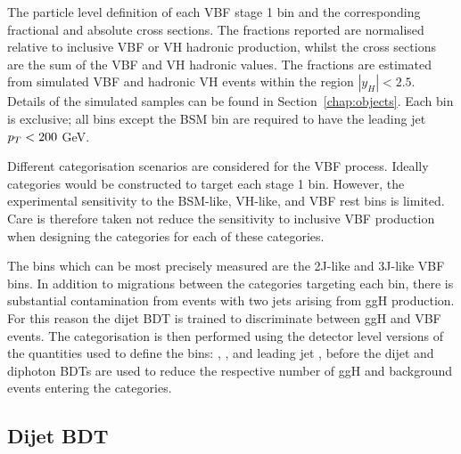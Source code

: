 \begin{table}
  \begin{centering}
    
    \caption{The particle level definition of each VBF stage 1 bin 
    and the corresponding fractional and absolute cross sections.
    The fractions reported are normalised relative to inclusive VBF or VH hadronic production, 
    whilst the cross sections are the sum of the VBF and VH hadronic values.
    The fractions are estimated from simulated VBF and hadronic VH \Hgg events 
    within the region $|y_H| < 2.5$.
    Details of the simulated samples can be found in Section~\ref{chap:objects}.
    Each bin is exclusive; all bins except the BSM bin 
    are required to have the leading jet $p_T < 200$ GeV.
    }
    \label{tab:cat_VBFfractions}
  \end{centering}
\end{table}

Different categorisation scenarios are considered for the VBF process.
Ideally categories would be constructed to target each stage 1 bin.
However, the experimental sensitivity to the BSM-like, VH-like, and VBF rest bins is limited.
Care is therefore taken not reduce the sensitivity to inclusive VBF production when designing 
the categories for each of these categories.

The bins which can be most precisely measured are the 2J-like and 3J-like VBF bins.
In addition to migrations between the categories targeting each bin, 
there is substantial contamination from events with two jets arising from ggH production.
For this reason the dijet BDT is trained to discriminate between ggH and VBF events.
The categorisation is then performed using the detector level versions 
of the quantities used to define the bins: \mjj, \ptHjj, and leading jet \pt, 
before the dijet and diphoton BDTs are used 
to reduce the respective number of ggH and background events entering the categories.

\subsection{Dijet BDT}

